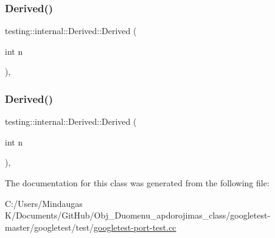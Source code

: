 \mbox{\label{classtesting_1_1internal_1_1_derived_a05a8e8354c7c09a9f3728a96c96f1edd}} 
\subsubsection{\texorpdfstring{Derived()}{Derived()}\hspace{0.1cm}{\footnotesize\ttfamily [2/3]}}
{\footnotesize\ttfamily testing\+::internal\+::\+Derived\+::\+Derived (\begin{DoxyParamCaption}\item[{int}]{n }\end{DoxyParamCaption})\hspace{0.3cm}{\ttfamily [inline]}, {\ttfamily [explicit]}}

\mbox{\label{classtesting_1_1internal_1_1_derived_a05a8e8354c7c09a9f3728a96c96f1edd}} 
\subsubsection{\texorpdfstring{Derived()}{Derived()}\hspace{0.1cm}{\footnotesize\ttfamily [3/3]}}
{\footnotesize\ttfamily testing\+::internal\+::\+Derived\+::\+Derived (\begin{DoxyParamCaption}\item[{int}]{n }\end{DoxyParamCaption})\hspace{0.3cm}{\ttfamily [inline]}, {\ttfamily [explicit]}}



The documentation for this class was generated from the following file\+:\begin{DoxyCompactItemize}
\item 
C\+:/\+Users/\+Mindaugas K/\+Documents/\+Git\+Hub/\+Obj\+\_\+\+Duomenu\+\_\+apdorojimas\+\_\+class/googletest-\/master/googletest/test/\mbox{\hyperlink{googletest-master_2googletest_2test_2googletest-port-test_8cc}{googletest-\/port-\/test.\+cc}}\end{DoxyCompactItemize}

